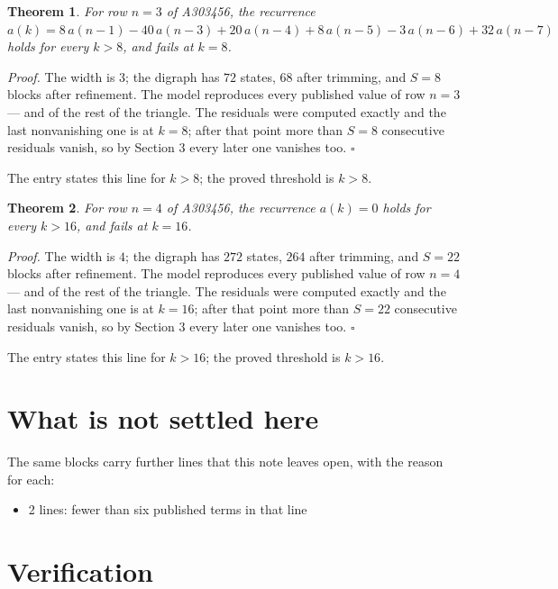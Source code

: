 \documentclass[11pt]{article}
\newtheorem{theorem}{Theorem}
\theoremstyle{definition}
\begin{document}
\begin{theorem} For row $n = 3$ of A303456, the recurrence $a(k) = 8\,a(n-1) - 40\,a(n-3) + 20\,a(n-4) + 8\,a(n-5) - 3\,a(n-6) + 32\,a(n-7)$ holds for every $k > 8$, and fails at $k = 8$.\end{theorem}

{\itshape Proof.} The width is $3$; the digraph has $72$ states, $68$ after trimming, and $S = 8$ blocks after refinement. The model reproduces every published value of row $n = 3$ --- and of the rest of the triangle. The residuals were computed exactly and the last nonvanishing one is at $k = 8$; after that point more than $S = 8$ consecutive residuals vanish, so by Section 3 every later one vanishes too. $\square$

The entry states this line for $k > 8$; the proved threshold is $k > 8$.

\begin{theorem} For row $n = 4$ of A303456, the recurrence $a(k) = 0$ holds for every $k > 16$, and fails at $k = 16$.\end{theorem}

{\itshape Proof.} The width is $4$; the digraph has $272$ states, $264$ after trimming, and $S = 22$ blocks after refinement. The model reproduces every published value of row $n = 4$ --- and of the rest of the triangle. The residuals were computed exactly and the last nonvanishing one is at $k = 16$; after that point more than $S = 22$ consecutive residuals vanish, so by Section 3 every later one vanishes too. $\square$

The entry states this line for $k > 16$; the proved threshold is $k > 16$.

\section{What is not settled here}

The same blocks carry further lines that this note leaves open, with the reason for each:

\begin{itemize}

\item 2 lines: fewer than six published terms in that line

\end{itemize}

\section{Verification}
\end{document}
